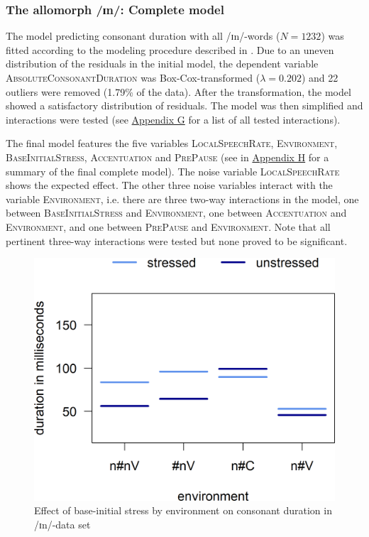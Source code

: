 \subsubsection{The allomorph /ɪn/: Complete model}\largerpage
The model predicting consonant duration with all /ɪn/-words ($N=1232$) was fitted according to the modeling procedure described in . Due to an uneven distribution of the residuals in the initial model, the dependent variable \textsc{AbsoluteConsonantDuration} was Box-Cox-transformed ($\lambda = 0.202$) and 22 outliers were removed (1.79\% of the data). 
After the transformation, the model showed a satisfactory distribution of residuals. The model was then simplified and interactions were tested (see \hyperref[Appendix G Summaries of tested interactions in experimental study]{Appendix G} for a list of all tested interactions).

The final model features the five variables \textsc{LocalSpeechRate}, \textsc{Environment}, \textsc{BaseInitialStress}, \textsc{Accentuation} and \textsc{PrePause} (see  in \hyperref[Appendix H: Model Summaries Experiment]{Appendix H} for a summary of the final complete model). 
The noise variable \textsc{LocalSpeech\-Rate} shows the expected effect. The other three noise variables interact with the variable \textsc{Environment}, i.e. there are three two-way interactions in the model, one between \textsc{BaseInitialStress} and \textsc{Environment}, one between \textsc{Accentuation} and \textsc{Environment}, and one between \textsc{PrePause} and \textsc{Environment}.  Note that all pertinent three-way interactions were tested but none proved to be significant.


	\begin{figure}
		 
		\includegraphics [scale=0.5] {images/Experiment/InModelCompleteInterEnvStress}
		
		\caption{Effect of base-initial stress by environment on consonant duration in /ɪn/-data set}	
		\label{fig:Env Stress In complete experiment} 
	\end{figure}%








